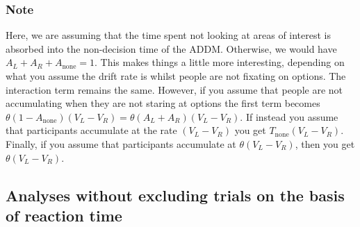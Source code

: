 \documentclass[doc, a4paper, apacite]{apa6}
\begin{document}
\subsubsection{Note}
Here, we are assuming that the time spent not looking at areas of interest is absorbed into the non-decision time of the ADDM. Otherwise, we would have $A_L + A_R + A_\text{none} = 1 $. This makes things a little more interesting, depending on what you assume the drift rate is whilst people are not fixating on options. The interaction term remains the same. However, if you assume that people are not accumulating when they are not staring at options the first term becomes $\theta(1-A_\text{none})(V_L-V_R)=\theta(A_L + A_R)(V_L - V_R)$. If instead you assume that participants accumulate at the rate $(V_L-V_R)$ you get $T_\text{none}(V_L-V_R)$. Finally, if you assume that participants accumulate at $\theta(V_L-V_R)$, then you get $\theta (V_L - V_R)$. 

\subsection{Analyses without excluding trials on the basis of reaction time}
\end{document}

